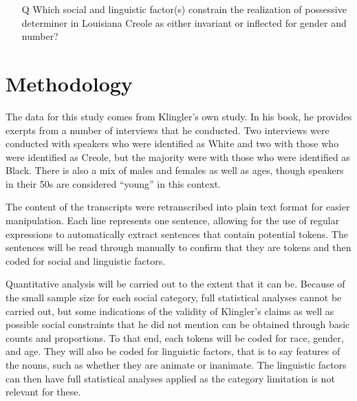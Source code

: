 \documentclass{article}
\begin{document}
    \begin{itemize}
      \item[Q] Which social and linguistic factor(s) constrain the realization of possessive determiner in Louisiana Creole as either invariant or inflected for gender and number?
    \end{itemize}

  \section{Methodology}
    The data for this study comes from Klingler's own study.
    In his book, he provides exerpts from a number of interviews that he conducted.
    Two interviews were conducted with speakers who were identified as White and two with those who were identified as Creole, but the majority were with those who were identified as Black.
    There is also a mix of males and females as well as ages, though speakers in their 50s are considered ``young'' in this context.

    The content of the transcripts were retranscribed into plain text format for easier manipulation.
    Each line represents one sentence, allowing for the use of regular expressions to automatically extract sentences that contain potential tokens.
    The sentences will be read through manually to confirm that they are tokens and then coded for social and linguistic factors.

    Quantitative analysis will be carried out to the extent that it can be.
    Because of the small sample size for each social category, full statistical analyses cannot be carried out, but some indications of the validity of Klingler's claims as well as possible social constraints that he did not mention can be obtained through basic counts and proportions.
    To that end, each tokens will be coded for race, gender, and age.
    They will also be coded for linguistic factors, that is to say features of the nouns, such as whether they are animate or inanimate.
    The linguistic factors can then have full statistical analyses applied as the category limitation is not relevant for these.
    \printbibliography
\end{document}
